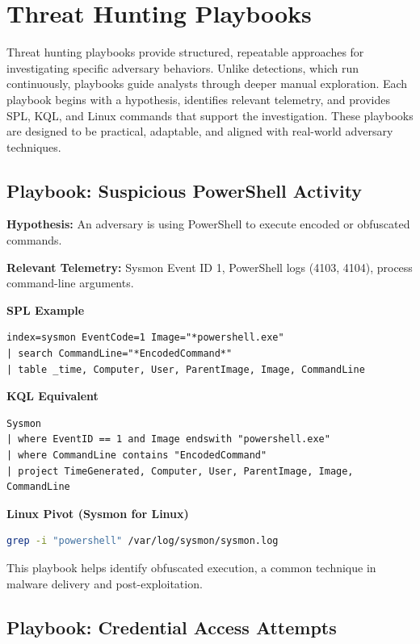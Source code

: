 \section{Threat Hunting Playbooks}

Threat hunting playbooks provide structured, repeatable approaches for investigating specific adversary behaviors. Unlike detections, which run continuously, playbooks guide analysts through deeper manual exploration. Each playbook begins with a hypothesis, identifies relevant telemetry, and provides SPL, KQL, and Linux commands that support the investigation. These playbooks are designed to be practical, adaptable, and aligned with real-world adversary techniques.

\subsection*{Playbook: Suspicious PowerShell Activity}

\textbf{Hypothesis:} An adversary is using PowerShell to execute encoded or obfuscated commands.

\textbf{Relevant Telemetry:} Sysmon Event ID 1, PowerShell logs (4103, 4104), process command-line arguments.

\textbf{SPL Example}
\begin{lstlisting}
index=sysmon EventCode=1 Image="*powershell.exe"
| search CommandLine="*EncodedCommand*"
| table _time, Computer, User, ParentImage, Image, CommandLine
\end{lstlisting}

\textbf{KQL Equivalent}
\begin{lstlisting}
Sysmon
| where EventID == 1 and Image endswith "powershell.exe"
| where CommandLine contains "EncodedCommand"
| project TimeGenerated, Computer, User, ParentImage, Image, CommandLine
\end{lstlisting}

\textbf{Linux Pivot (Sysmon for Linux)}
\begin{lstlisting}[language=bash]
grep -i "powershell" /var/log/sysmon/sysmon.log
\end{lstlisting}

This playbook helps identify obfuscated execution, a common technique in malware delivery and post-exploitation.

\subsection*{Playbook: Credential Access Attempts}

